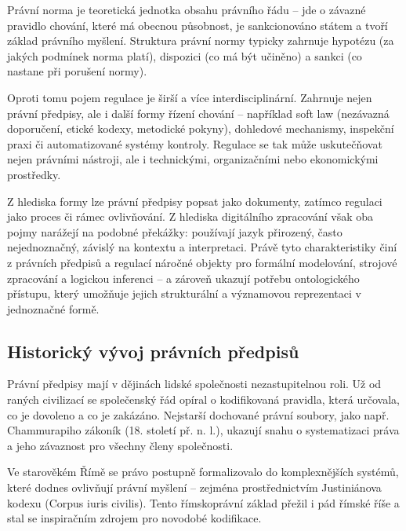 Právní norma je teoretická jednotka obsahu právního řádu – jde o závazné pravidlo chování, které má obecnou působnost, je sankcionováno státem a tvoří základ právního myšlení. Struktura právní normy typicky zahrnuje hypotézu (za jakých podmínek norma platí), dispozici (co má být učiněno) a sankci (co nastane při porušení normy). \cite{Sovova2014,Boguszak2001}

Oproti tomu pojem regulace je širší a více interdisciplinární. Zahrnuje nejen právní předpisy, ale i další formy řízení chování – například soft law (nezávazná doporučení, etické kodexy, metodické pokyny), dohledové mechanismy, inspekční praxi či automatizované systémy kontroly. Regulace se tak může uskutečňovat nejen právními nástroji, ale i technickými, organizačními nebo ekonomickými prostředky. \cite{Weinberger2017,Boguszak2001}

Z hlediska formy lze právní předpisy popsat jako dokumenty, zatímco regulaci jako proces či rámec ovlivňování. \cite{Boguszak2001} Z hlediska digitálního zpracování však oba pojmy narážejí na podobné překážky: používají jazyk přirozený, často nejednoznačný, závislý na kontextu a interpretaci. Právě tyto charakteristiky činí z právních předpisů a regulací náročné objekty pro formální modelování, strojové zpracování a logickou inferenci – a zároveň ukazují potřebu ontologického přístupu, který umožňuje jejich strukturální a významovou reprezentaci v jednoznačné formě. 


\subsection{Historický vývoj právních předpisů}
\label{sec:historický-vývoj-právních-předpisů}
Právní předpisy mají v dějinách lidské společnosti nezastupitelnou roli. Už od raných civilizací se společenský řád opíral o kodifikovaná pravidla, která určovala, co je dovoleno a co je zakázáno. Nejstarší dochované právní soubory, jako např. Chammurapiho zákoník (18. století př. n. l.), ukazují snahu o systematizaci práva a jeho závaznost pro všechny členy společnosti. \cite{Hammurapi}

Ve starověkém Římě se právo postupně formalizovalo do komplexnějších systémů, které dodnes ovlivňují právní myšlení – zejména prostřednictvím Justiniánova kodexu (Corpus iuris civilis). Tento římskoprávní základ přežil i pád římské říše a stal se inspiračním zdrojem pro novodobé kodifikace. \cite{Justinian}

